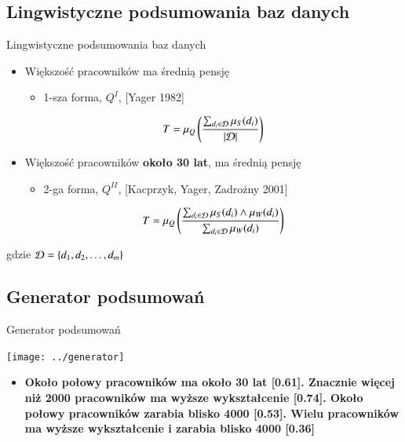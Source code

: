 \documentclass{beamer}
\begin{document}
\subsection{Lingwistyczne podsumowania baz danych}
\begin{frame}{Lingwistyczne podsumowania baz danych}%
		\begin{itemize}
			\item <1->{{\color{blue}Większość} pracowników ma {\color{blue}
średnią pensję}} 
\begin{itemize}
\item {\footnotesize \alert<1>{1-sza forma}, $Q^{I}$, [Yager 1982]}
\end{itemize}
\begin{equation}
T = \mu_Q\left( {{\sum\nolimits_{d_i\in{\cal D}}\mu_S(d_i)}\over|{\cal D}|}\right)
\end{equation} 
\item <2->{{\color{blue}Większość} pracowników {\bfseries\color{blue}  około 30 lat}, ma {\color{blue} średnią pensję}} 
\begin{itemize}
\item {\footnotesize \alert<2>{2-ga forma}, $Q^{II}$, [Kacprzyk, Yager, Zadrożny 2001]}
\end{itemize}
\begin{equation}
T=\mu_Q\left( {\sum\nolimits_{d_i\in{\cal D}}\mu_S(d_i)\wedge
\mu_W(d_i)}\over{\sum\nolimits_{d_i\in{\cal D}}\mu_W(d_i)}\right)
\end{equation}
\end{itemize}
gdzie ${\cal D}=\{d_1, d_2, \ldots, d_m\}$
\end{frame}

\subsection{Generator podsumowań}
\begin{frame}{Generator podsumowań}%

	\begin{center}
		\texttt{[image: ../generator]}
	\end{center}


\begin{itemize}
\item <2->{\footnotesize\bfseries
\alert<3>{Około połowy pracowników} ma \alert<4>{około 30 lat}
\alert<5>{[0.61]}. \alert<6>{Znacznie więcej niż
2000 pracowników} ma \alert<7>{wyższe wykształcenie} [0.74]. Około połowy pracowników
zarabia blisko 4000 [0.53]. Wielu pracowników \alert<8>{ma wyższe wykształcenie i
zarabia blisko 4000} [0.36]
}
\end{itemize}
\end{frame}
\end{document}

